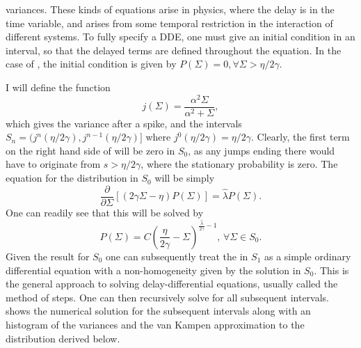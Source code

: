 variances. These kinds of equations arise in physics, where the delay is in the time variable, and arises from some temporal restriction in the interaction of different systems.
To fully specify a DDE, one must give an initial condition in an interval, so that the delayed terms are defined throughout the equation. In the case of , the
initial condition is given by $P(\Sigma) = 0, \forall \Sigma> \eta/2\gamma$.\par
I will define the function 
$$
j(\Sigma) = \frac{\alpha^2 \Sigma}{\alpha^2+\Sigma},
$$ 
which gives the variance after a spike, and the intervals $S_n = (j^n(\eta/2\gamma), j^{n-1}(\eta/2\gamma)]$ where $j^0(\eta/2\gamma) = \eta/2\gamma$. Clearly, the first term on the
right hand side of  will be 
zero in $S_0$, as any jumps 
ending there would have to originate 
from $s > \eta/2\gamma$, where the stationary probability is zero. The equation for the distribution in $S_0$ will be simply
\[
\frac{\partial}{\partial \Sigma} \left[\left(2\gamma\Sigma-\eta\right) P(\Sigma)\right]=\hat{\lambda} P(\Sigma).
\]
One can readily see that this will be solved by
\begin{equation}
\label{eq:dist_1d_exact}
P(\Sigma)= C \left(\frac{\eta}{2\gamma} - \Sigma\right)^{\frac{\hat{\lambda}}{2\gamma} - 1},\,\forall \Sigma \in S_0.
\end{equation}
Given the result for $S_0$ one can subsequently treat the  in $S_1$ as a simple ordinary differential equation with a non-homogeneity given by the solution in 
$S_0$. This is the general approach to solving delay-differential equations, usually called the method of steps. One can then recursively solve for all subsequent intervals.  shows the numerical solution for the subsequent intervals along with an histogram of the variances and the van Kampen approximation to the distribution derived below.\par
